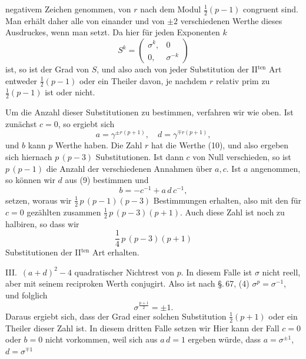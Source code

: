 negativem Zeichen genommen, von $r$ nach dem Modul $\frac{1}{2}(p-1)$
congruent sind. Man erhält daher alle von einander und von
$\pm 2$ verschiedenen Werthe dieses Ausdruckes, wenn man
setzt. Da hier für jeden Exponenten $k$
\[
S^k = \begin{pmatrix} \sigma^k, & 0 \\ 0, & \sigma^{-k} \end{pmatrix}
\]
ist, so ist der Grad von $S$, und also auch von jeder Substitution
der II$^{\mathrm{ten}}$ Art entweder $\frac{1}{2}(p-1)$ oder ein Theiler davon, je
nachdem $r$ relativ prim zu $\frac{1}{2}(p-1)$ ist oder nicht.

Um die Anzahl dieser Substitutionen zu bestimmen, verfahren
 wir wie oben. Ist zunächst $c = 0$, so ergiebt sich
\[
a = \gamma^{\pm r(p+1)}, \quad d = \gamma^{\mp r(p+1)},
\]
und $b$ kann $p$ Werthe haben. Die Zahl $r$ hat die Werthe (10),
und also ergeben sich hiernach $p\,(p-3)$ Substitutionen. Ist
dann $c$ von Null verschieden, so ist $p\,(p-1)$ die Anzahl der
verschiedenen Annahmen über $a, c$. Ist $a$ angenommen, so können
wir $d$ aus (9) bestimmen und
\[
b = -c^{-1} + a\,d\,c^{-1},
\]
setzen, woraus wir $\frac{1}{2}\,p\,(p-1)(p-3)$ Bestimmungen erhalten,
also mit den für $c = 0$ gezählten zusammen $\frac{1}{2}\,p\,(p-3)(p+1)$.
Auch diese Zahl ist noch zu halbiren, so dass wir
\[
\frac{1}{4}\,p\,(p-3)(p+1)
\]
Substitutionen der II$^{\mathrm{ten}}$ Art erhalten.

III.~$(a+d)^2 - 4$ quadratischer Nichtrest von $p$. In diesem
Falle ist $\sigma$ nicht reell, aber mit seinem reciproken Werth
conjugirt. Also ist nach \S.\,67, (4) $\sigma^p = \sigma^{-1}$, und folglich
\[
\sigma^{\frac{p+1}{2}} = \pm 1.
\]
Daraus ergiebt sich, dass der Grad einer solchen Substitution
 $\frac{1}{2}(p+1)$ oder ein Theiler dieser Zahl ist.
In diesem dritten Falle setzen wir
Hier kann der Fall $c = 0$ oder $b = 0$ nicht vorkommen,
weil sich aus $a\,d = 1$ ergeben würde, dass $a = \sigma^{\pm 1}$, $d = \sigma^{\mp 1}$
